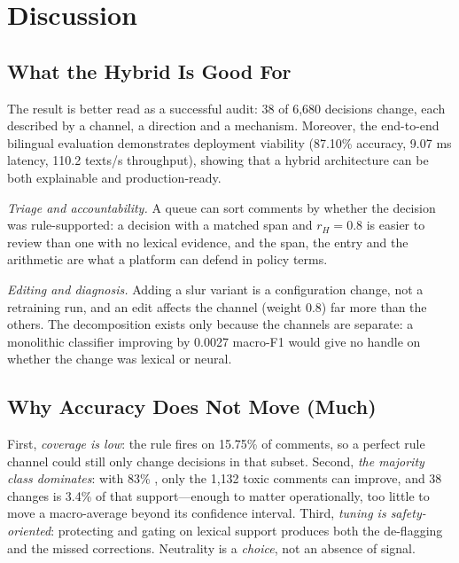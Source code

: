 \section{Discussion}
\label{sec:discussion}

\subsection{What the Hybrid Is Good For}
\label{sec:value}

The result is better read as a successful audit: 38 of 6{,}680 decisions change,
each described by a channel, a direction and a mechanism.  Moreover, the
end-to-end bilingual evaluation demonstrates deployment viability (87.10\%
accuracy, 9.07 ms latency, 110.2 texts/s throughput), showing that a hybrid architecture can
be both explainable and production-ready.

\emph{Triage and accountability.}  A queue can sort comments by whether the
decision was rule-supported: a \hate{} decision with a matched span and
$r_H=0.8$ is easier to review than one with no lexical evidence, and the span,
the entry and the arithmetic are what a platform can defend in policy terms.

\emph{Editing and diagnosis.}  Adding a slur variant is a configuration change,
not a retraining run, and an edit affects the \hate{} channel (weight 0.8) far
more than the others.  The decomposition exists only because the channels are
separate: a monolithic classifier improving by 0.0027 macro-F1 would give no
handle on whether the change was lexical or neural.

\subsection{Why Accuracy Does Not Move (Much)}
\label{sec:why_neutral}

First, \emph{coverage is low}: the rule fires on 15.75\% of comments, so a
perfect rule channel could still only change decisions in that subset.  Second,
\emph{the majority class dominates}: with 83\% \clean{}, only the 1{,}132 toxic
comments can improve, and 38 changes is 3.4\% of that support---enough to matter
operationally, too little to move a macro-average beyond its confidence
interval.  Third, \emph{tuning is safety-oriented}: protecting \clean{} and
gating \hate{} on lexical support produces both the de-flagging and the missed
corrections.  Neutrality is a \emph{choice}, not an absence of signal.

